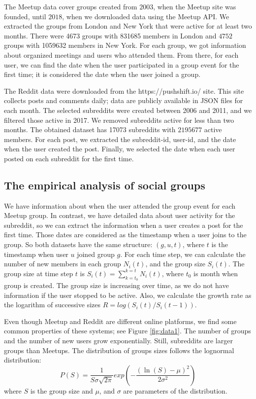The Meetup data cover groups created from $2003$, when the Meetup site was founded, until $2018$, when we downloaded data using the Meetup API. We extracted the groups from London and New York that were active for at least two months. There were 4673 groups with 831685 members in London and $4752$ groups with 1059632 members in New York. For each group, we got information about organized meetings and users who attended them. From there, for each user, we can find the date when the user participated in a group event for the first time; it is considered the date when the user joined a group. 

The Reddit data were downloaded from the https://pushshift.io/ site. This site collects posts and comments daily; data are publicly available in JSON files for each month. The selected subreddits were created between 2006 and 2011, and we filtered those active in 2017. We removed subreddits active for less than two months. The obtained dataset has 17073 subreddits with $2 195 677$ active members. For each post, we extracted the subreddit-id, user-id, and the date when the user created the post. Finally, we selected the date when each user posted on each subreddit for the first time. 

\subsection{The empirical analysis of social groups}

We have information about when the user attended the group event for each Meetup group. In contrast, we have detailed data about user activity for the subreddit, so we can extract the information when a user creates a post for the first time. Those dates are considered as the timestamp when a user joins to the group. So both datasets have the same structure: $(g, u, t)$, where $t$ is the timestamp when user $u$ joined group $g$. For each time step, we can calculate the number of new members in each group $N_i(t)$, and the group size $S_{i}(t)$. The group size at time step $t$ is $S_{i}(t)=\sum^{k=t}_{k=t_{0}}N_{i}(t)$, where $t_0$ is month when group is created. The group size is increasing over time, as we do not have information if the user stopped to be active. Also, we calculate the growth rate as the logarithm of successive sizes $R = log(S_{i}(t)/S_{i}(t-1))$.

Even though Meetup and Reddit are different online platforms, we find some common properties of these systems; see Figure \ref{fig:data1}. The number of groups and the number of new users grow exponentially. Still, subreddits are larger groups than Meetups. The distribution of groups sizes follows the lognormal distribution:
\begin{equation}
P(S)=\frac{1}{S\sigma\sqrt{2\pi}}exp(-\frac{(\ln(S)-\mu)^{2}}{2\sigma^{2}})
\label{eq:log}
\end{equation}
where $S$ is the group size and $\mu$, and $\sigma$ are parameters of the distribution.

